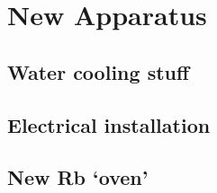 \appendix
\renewcommand{\thechapter}{B}
\renewcommand{\chaptername}{Appendix}

\chapter{New Apparatus}
\label{app:Ramsey_phases}


\section{Water cooling stuff}
\section{Electrical installation}
\section{New Rb `oven'}

